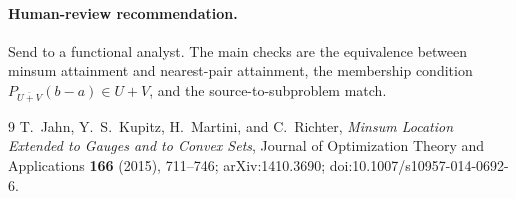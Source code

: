 \documentclass[11pt]{article}
\begin{document}
\paragraph{Human-review recommendation.}
Send to a functional analyst.  The main checks are the equivalence between
minsum attainment and nearest-pair attainment, the membership condition
$P_{\overline{U+V}}(b-a)\in U+V$, and the source-to-subproblem match.

\begin{thebibliography}{9}
T.~Jahn, Y.~S.~Kupitz, H.~Martini, and C.~Richter,
\emph{Minsum Location Extended to Gauges and to Convex Sets},
Journal of Optimization Theory and Applications \textbf{166} (2015),
711--746; arXiv:1410.3690; doi:10.1007/s10957-014-0692-6.
\end{thebibliography}
\end{document}
